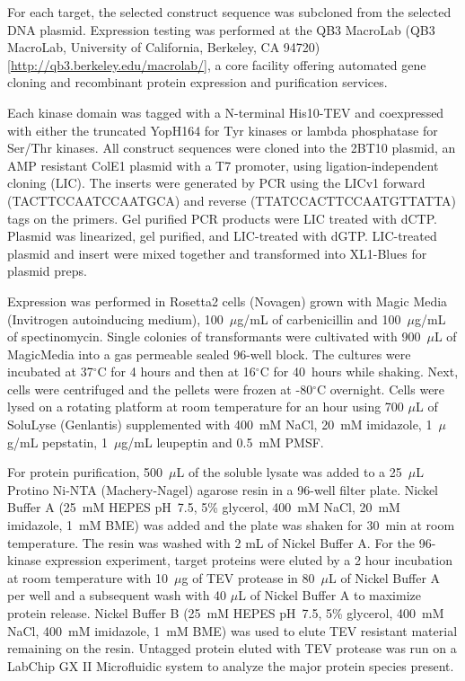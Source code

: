 \documentclass[phd,tocprelim]{cornell}
\begin{document}
For each target, the selected construct sequence was subcloned from the selected DNA plasmid.
Expression testing was performed at the QB3 MacroLab (QB3 MacroLab, University of California, Berkeley, CA 94720) [\url{http://qb3.berkeley.edu/macrolab/}], a core facility offering automated gene cloning and recombinant protein expression and purification services.

Each kinase domain was tagged with a N-terminal His10-TEV and coexpressed with either the truncated YopH164 for Tyr kinases or lambda phosphatase for Ser/Thr kinases.
All construct sequences were cloned into the 2BT10 plasmid, an AMP resistant ColE1 plasmid with a T7 promoter, using ligation-independent cloning (LIC).
The inserts were generated by PCR using the LICv1 forward (TACTTCCAATCCAATGCA) and reverse (TTATCCACTTCCAATGTTATTA) tags on the primers.
Gel purified PCR products were LIC treated with dCTP. 
Plasmid was linearized, gel purified, and LIC-treated with dGTP.
LIC-treated plasmid and insert were mixed together and transformed into XL1-Blues for plasmid preps. 

Expression was performed in Rosetta2 cells (Novagen) grown with Magic Media (Invitrogen autoinducing medium), 100~$\mu$g/mL of carbenicillin and 100~$\mu$g/mL of spectinomycin. 
Single colonies of transformants were cultivated with 900~$\mu$L of MagicMedia into a gas permeable sealed 96-well block. 
The cultures were incubated at 37$^\circ$C for 4 hours and then at 16$^\circ$C for 40~hours while shaking. 
Next, cells were centrifuged and the pellets were frozen at -80$^\circ$C overnight. 
Cells were lysed on a rotating platform at room temperature for an hour using 700 $\mu$L of SoluLyse (Genlantis) supplemented with 400~mM NaCl, 20~mM imidazole, 1~$\mu$g/mL pepstatin, 1~$\mu$g/mL leupeptin and 0.5~mM PMSF. 

For protein purification, 500~$\mu$L of the soluble lysate was added to a 25~$\mu$L Protino Ni-NTA (Machery-Nagel) agarose resin in a 96-well filter plate. 
Nickel Buffer A (25~mM HEPES pH~7.5, 5\% glycerol, 400~mM NaCl, 20~mM imidazole, 1~mM BME) was added and the plate was shaken for 30~min at room temperature. 
The resin was washed with 2 mL of Nickel Buffer A. 
For the 96-kinase expression experiment, target proteins were eluted by a 2 hour incubation at room temperature with 10~$\mu$g of TEV protease in 80~$\mu$L of Nickel Buffer A per well and a subsequent wash with 40 $\mu$L of Nickel Buffer A to maximize protein release. 
Nickel Buffer B (25~mM HEPES pH~7.5, 5\% glycerol, 400~mM NaCl, 400~mM imidazole, 1~mM BME) was used to elute TEV resistant material remaining on the resin.
Untagged protein eluted with TEV protease was run on a LabChip GX II Microfluidic system to analyze the major protein species present. 
\end{document}
